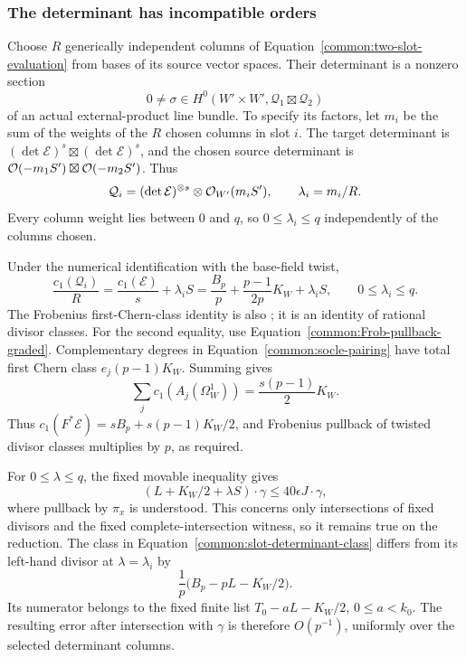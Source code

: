 \subsubsection{The determinant has incompatible orders}

Choose $R$ generically independent columns of
Equation~\eqref{common:two-slot-evaluation} from bases of its source vector spaces.
Their determinant is a nonzero section
\[
 0\ne\sigma\in H^0(W'\times W',\mathcal Q_1\boxtimes\mathcal Q_2)
\]
of an actual external-product line bundle. To specify its factors,
let $m_i$ be the sum of the weights of the $R$ chosen columns in
slot $i$. The target determinant is
$(\det\mathcal E)^s\boxtimes(\det\mathcal E)^s$, and the
chosen source determinant is
$\mathcal{O}(-m_1S')\boxtimes\mathcal{O}(-m_2S')$. Thus
\[
 \mathcal Q_i=(\det\mathcal E)^{\otimes s}
                 \otimes\mathcal{O}_{W'}(m_iS'),\qquad
 \lambda_i=m_i/R.
\]
Every column weight lies between $0$ and $q$, so
$0\le\lambda_i\le q$ independently of the columns chosen.

Under the numerical identification with the base-field twist,
\begin{equation}\label{common:slot-determinant-class}
 \frac{c_1(\mathcal Q_i)}R
 =\frac{c_1(\mathcal E)}s+\lambda_iS
 =\frac{B_p}p+\frac{p-1}{2p}K_W+\lambda_iS,
 \qquad 0\le\lambda_i\le q.
\end{equation}
The Frobenius first-Chern-class identity is also
\cite[Lemma~4.2]{Sun2008}; it is an identity of rational divisor classes.  For the second equality, use
Equation~\eqref{common:Frob-pullback-graded}.  Complementary degrees in
Equation~\eqref{common:socle-pairing} have total first Chern class
$e_j(p-1)K_W$.  Summing gives
\[
 \sum_jc_1(A_j(\Omega_W^1))=\frac{s(p-1)}2K_W.
\]
Thus $c_1(F^*\mathcal E)=sB_p+s(p-1)K_W/2$, and Frobenius pullback of
twisted divisor classes multiplies by $p$, as required.

For $0\le\lambda\le q$, the fixed movable inequality gives
\[
 (L+K_W/2+\lambda S)\cdot\gamma\le40\epsilon J\cdot\gamma,
\]
where pullback by $\pi_x$ is understood. This concerns only
intersections of fixed divisors and the fixed complete-intersection
witness, so it remains true on the reduction. The class in
Equation~\eqref{common:slot-determinant-class} differs from its
left-hand divisor at $\lambda=\lambda_i$ by
\[
 \frac1p\bigl(B_p-pL-K_W/2\bigr).
\]
Its numerator belongs to the fixed finite list
$T_0-aL-K_W/2$, $0\le a<k_0$. The resulting error after
intersection with $\gamma$ is therefore $O(p^{-1})$, uniformly
over the selected determinant columns.

